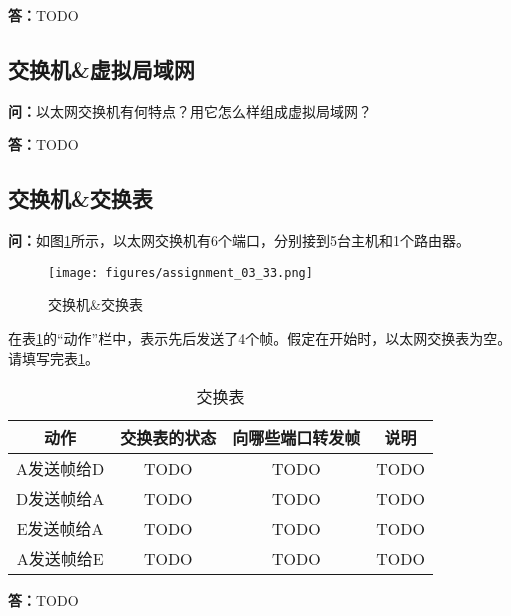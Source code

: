 \documentclass[12pt,hyperref,a4paper,UTF8]{ctexart}
\begin{document}
\textbf{答：}TODO

\subsection{交换机\&虚拟局域网}
\textbf{问：}以太网交换机有何特点？用它怎么样组成虚拟局域网？


\textbf{答：}TODO

\subsection{交换机\&交换表}
\textbf{问：}如图\ref{fig:3-33}所示，以太网交换机有6个端口，分别接到5台主机和1个路由器。
\begin{figure}[h!]\label{fig:3-33}
    \centering
    \texttt{[image: figures/assignment\_03\_33.png]}
    \caption{交换机\&交换表}
\end{figure}
在表\ref{tab:3-33}的“动作”栏中，表示先后发送了4个帧。假定在开始时，以太网交换表为空。请填写完表\ref{tab:3-33}。
\begin{table}[h!]\label{tab:3-33}
    \centering
    \caption{交换表}
    \begin{tabular}{c|c|c|c}
        \toprule
        动作 & 交换表的状态 & 向哪些端口转发帧 & 说明 \\
        \midrule
        A发送帧给D & TODO & TODO & TODO \\
        D发送帧给A & TODO & TODO & TODO \\
        E发送帧给A & TODO & TODO & TODO \\
        A发送帧给E & TODO & TODO & TODO \\
        \bottomrule
    \end{tabular}
\end{table}

\textbf{答：}TODO
\end{document}
